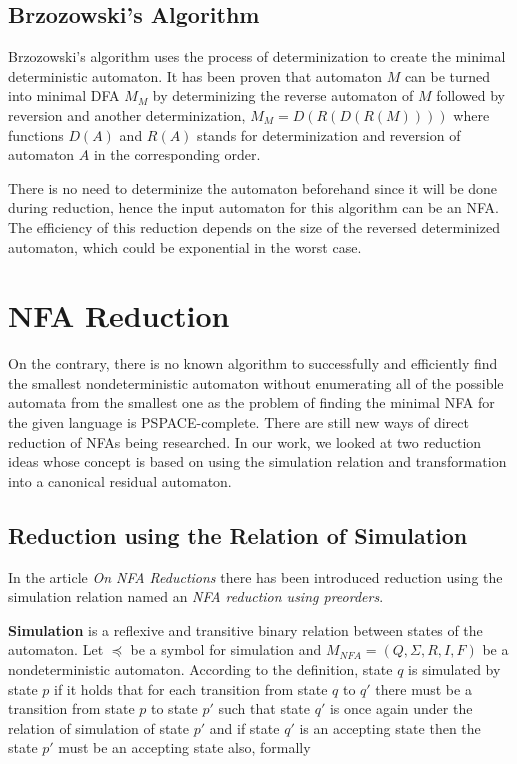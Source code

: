 \subsection{Brzozowski's Algorithm}
Brzozowski’s algorithm uses the process of determinization to create the minimal deterministic automaton. It has been proven \cite{Bonchi2012, Gracia} that automaton $M$ can be turned into minimal DFA $M_M$ by determinizing the reverse automaton of $M$ followed by reversion and another determinization, $M_M=D(R(D(R(M))))$  where functions $D(A)$ and $R(A)$ stands for determinization and reversion of automaton $A$ in the corresponding order.

There is no need to determinize the automaton beforehand since it will be done during reduction, hence the input automaton for this algorithm can be an NFA. The efficiency of this reduction depends on the size of the reversed determinized automaton, which could be exponential in the worst case.

\section{NFA Reduction}
On the contrary, there is no known algorithm to successfully and efficiently find the smallest nondeterministic automaton without enumerating all of the possible automata from the smallest one as the problem of finding the minimal NFA for the given language is PSPACE-complete. There are still new ways of direct reduction of NFAs being researched. In our work, we looked at two reduction ideas whose concept is based on using the simulation relation and transformation into a canonical residual automaton.

\subsection{Reduction using the Relation of Simulation}
In the article \textit{On NFA Reductions} \cite{Ilie2004} there has been introduced reduction using the simulation relation named an \textit{NFA reduction using preorders}.

\textbf{Simulation} is a reflexive and transitive binary relation between states of the automaton. Let $\preceq$ be a symbol for simulation and $M_{NFA}=(Q,\Sigma, R, I, F)$ be a nondeterministic automaton. According to the definition, state $q$ is simulated by state $p$ if it holds that for each transition from state $q$ to $q'$ there must be a transition from state $p$ to state $p'$ such that state $q'$ is once again under the relation of simulation of state $p'$ and if state $q'$ is an accepting state then the state $p'$ must be an accepting state also, formally

